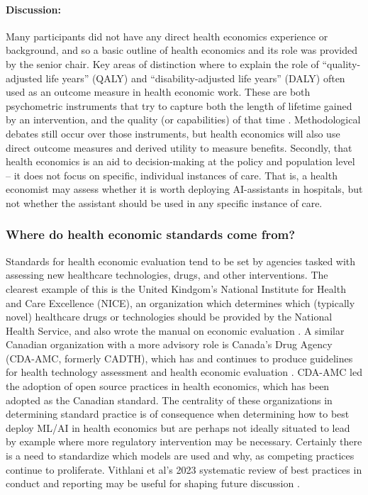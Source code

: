 \paragraph{Discussion:} Many participants did not have any direct health economics experience or background, and so a basic outline of health economics and its role was provided by the senior chair. Key areas of distinction where to explain the role of “quality-adjusted life years” (QALY) and “disability-adjusted life years” (DALY) often used as an outcome measure in health economic work. These are both psychometric instruments that try to capture both the length of lifetime gained by an intervention, and the quality (or capabilities) of that time \citep{Howren2013}. Methodological debates still occur over those instruments, but health economics will also use direct outcome measures and derived utility to measure benefits. Secondly, that health economics is an aid to decision-making at the policy and population level – it does not focus on specific, individual instances of care. That is, a health economist may assess whether it is worth deploying AI-assistants in hospitals, but not whether the assistant should be used in any specific instance of care.

\subsubsection{Where do health economic standards come from?}

Standards for health economic evaluation tend to be set by agencies tasked with assessing new healthcare technologies, drugs, and other interventions. The clearest example of this is the United Kindgom’s National Institute for Health and Care Excellence (NICE), an organization which determines which (typically novel) healthcare drugs or technologies should be provided by the National Health Service, and also wrote the manual on economic evaluation \citep{national2022nice}. A similar Canadian organization with a more advisory role is Canada’s Drug Agency (CDA-AMC, formerly CADTH), which has and continues to produce guidelines for health technology assessment and health economic evaluation \citep{cadth}. CDA-AMC led the adoption of open source practices in health economics, which has been adopted as the Canadian standard. The centrality of these organizations in determining standard practice is of consequence when determining how to best deploy ML/AI in health economics but are perhaps not ideally situated to lead by example where more regulatory intervention may be necessary. Certainly there is a need to standardize which models are used and why, as competing practices continue to proliferate. Vithlani et al’s 2023 systematic review of best practices in conduct and reporting may be useful for shaping future discussion \citep{vithlani2023economic}.

